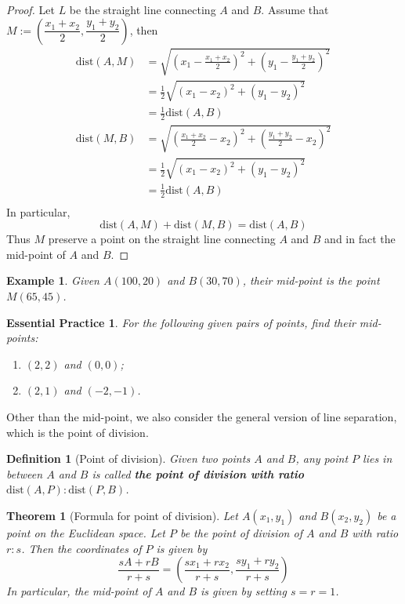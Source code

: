 \documentclass[12pt]{article}
\newtheorem{definition}{Definition}[section]
\newtheorem*{theorem}{Theorem}
\newtheorem*{example}{Example}
\newtheorem{exercise}{Essential Practice}[subsubsection]
\begin{document}
    \begin{proof}
        Let $L$ be the straight line connecting $A$ and $B$. Assume that $M:=(\dfrac{x_1+x_2}{2},\dfrac{y_1+y_2}{2})$, then\begin{align*}
            \mathrm{dist}(A,M)&=\sqrt{(x_1-\frac{x_1+x_2}{2})^2+(y_1-\frac{y_1+y_2}{2})^2}\\
            &=\frac{1}{2}\sqrt{(x_1-x_2)^2+(y_1-y_2)^2}\\
            &=\frac{1}{2}\mathrm{dist}(A,B)\\
            \mathrm{dist}(M,B)&=\sqrt{(\frac{x_1+x_2}{2}-x_2)^2+(\frac{y_1+y_2}{2}-x_2)^2}\\
            &=\frac{1}{2}\sqrt{(x_1-x_2)^2+(y_1-y_2)^2}\\
            &=\frac{1}{2}\mathrm{dist}(A,B)\\
        \end{align*}
        In particular, $$\mathrm{dist}(A,M)+\mathrm{dist}(M,B)=\mathrm{dist}(A,B)$$
        Thus $M$ preserve a point on the straight line connecting $A$ and $B$ and in fact the mid-point of $A$ and $B$.
    \end{proof}

    \begin{example}
        Given $A(100,20)$ and $B(30,70)$, their mid-point is the point $M(65,45)$.
    \end{example}

    \begin{exercise}
        For the following given pairs of points, find their mid-points:\begin{enumerate}
            \item $(2,2)$ and $(0,0)$;
            \item $(2,1)$ and $(-2,-1)$.
        \end{enumerate}
    \end{exercise}

    Other than the mid-point, we also consider the general version of line separation, which is the point of division.

    \begin{definition}[Point of division]
        Given two points $A$ and $B$, any point $P$ lies in between $A$ and $B$ is called \textbf{the point of division with ratio $\mathrm{dist}(A,P):\mathrm{dist}(P,B)$}.
    \end{definition}

    \begin{theorem}[Formula for point of division]
        Let $A(x_1,y_1)$ and $B(x_2,y_2)$ be a point on the Euclidean space. Let $P$ be the point of division of $A$ and $B$ with ratio $r:s$. Then the coordinates of $P$ is given by $$\frac{sA+rB}{r+s}=(\frac{sx_1+rx_2}{r+s},\frac{sy_1+ry_2}{r+s})$$ In particular, the mid-point of $A$ and $B$ is given by setting $s=r=1$.
    \end{theorem}
\end{document}
